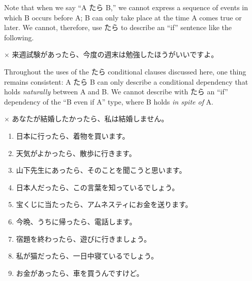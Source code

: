 \documentclass[notoc,notitlepage]{tufte-book}
\begin{document}
\begin{warning}
  Note that when we say ``A たら B,'' we cannot express a sequence of events in which B occurs before A; B can only take place at the time A comes true or later. We cannot, therefore, use たら to describe an ``if'' sentence like the following.
  \begin{center}
    $\times$ 来週試験があったら、今度の週末は勉強したほうがいいですよ。 
  \end{center}
\end{warning}

\begin{note}
  Throughout the uses of the たら conditional clauses discussed here, one thing remains consistent: A たら B can only describe a conditional dependency that holds \textit{naturally} between A and B. We cannot describe with たら an ``if'' dependency of the ``B even if A'' type, where B holds \textit{in spite of} A.
  \begin{center}
    $\times$ あなたが結婚したかったら、私は結婚しません。
  \end{center}
\end{note}

\begin{eg}
  \begin{enumerate}
    \item 日本に行ったら、着物を買います。
    \item 天気がよかったら、散歩に行きます。
    \item 山下先生にあったら、そのことを聞こうと思います。
    \item 日本人だったら、この言葉を知っているでしょう。
    \item 宝くじに当たったら、アムネスティにお金を送ります。
    \item 今晩、うちに帰ったら、電話します。
    \item 宿題を終わったら、遊びに行きましょう。
    \item 私が猫だったら、一日中寝ているでしょう。
    \item お金があったら、車を買うんですけど。
  \end{enumerate}
\end{eg}
\end{document}
